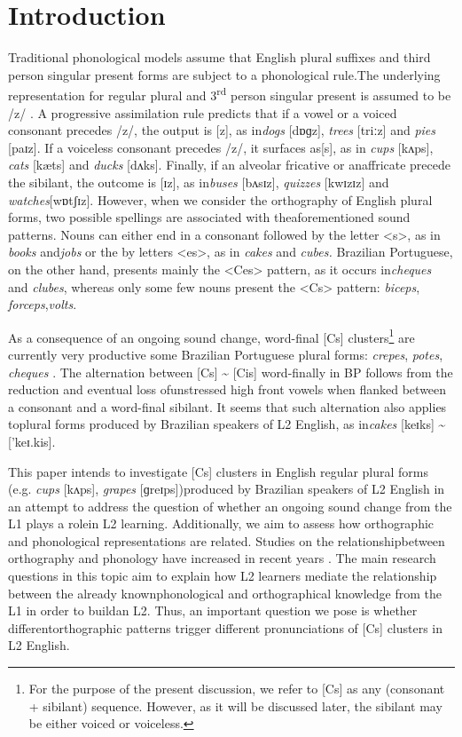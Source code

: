 \section{Introduction}
Traditional phonological models assume that English plural suffixes and
third person singular present forms are subject to a phonological rule.The
underlying representation for regular plural and
3\textsuperscript{rd} person singular present is assumed to be /z/ \citep{hayes2011}.
A progressive assimilation rule predicts that if a vowel
or a voiced consonant precedes /z/, the output is {[}z{]}, as in\emph{dogs}
{[}dɒɡz{]}, \emph{trees} {[}triːz{]} and \emph{pies}
{[}paɪz{]}. If a voiceless consonant precedes /z/, it surfaces as{[}s{]}, as in
\emph{cups} {[}kʌps{]}, \emph{cats} {[}kæts{]} and
\emph{ducks} {[}dʌks{]}. Finally, if an alveolar fricative or anaffricate
precede the sibilant, the outcome is {[}ɪz{]}, as in\emph{buses} {[}bʌsɪz{]},
\emph{quizzes} {[}kwɪzɪz{]} and \emph{watches}{[}wɒtʃɪz{]}. However, when we
consider the orthography of English
plural forms, two possible spellings are associated with theaforementioned
sound patterns. Nouns can either end in a consonant
followed by the letter \textless s\textgreater, as in \emph{books}
and\emph{jobs} or the by letters \textless es\textgreater, as in
\emph{cakes} and \emph{cubes.} Brazilian Portuguese, on the other hand,
presents mainly the \textless Ces\textgreater{} pattern, as it occurs
in\emph{cheques }and\emph{ clubes}, whereas only some few nouns present
the \textless Cs\textgreater{} pattern: \emph{biceps},
\emph{forceps},\emph{volts}.

As a consequence of an ongoing sound change, word-final {[}Cs{]}
clusters\footnote{ For the purpose of the present discussion, we refer  to
{[}Cs{]} as any (consonant + sibilant) sequence. However, as it
will be discussed later, the sibilant may be either voiced or  voiceless.}
are currently very productive some Brazilian Portuguese
plural forms: \emph{crepes}, \emph{potes}, \emph{cheques} \citep{soares2016}. The
alternation between {[}Cs{]} \textasciitilde{} {[}Cis{]}
word-finally in BP follows from the reduction and eventual loss ofunstressed
high front vowels when flanked between a consonant and a
word-final sibilant. It seems that such alternation also applies toplural forms
produced by Brazilian speakers of L2 English, as in\emph{cakes} {[}keɪks{]}
\textasciitilde{} {[}'keɪ.kis{]}.

This paper intends to investigate {[}Cs{]} clusters in English regular
plural forms (e.g. \emph{cups} {[}kʌps{]}, \emph{grapes} {[}ɡreɪps{]})produced
by Brazilian speakers of L2 English in an attempt to address
the question of whether an ongoing sound change from the L1 plays a rolein L2
learning. Additionally, we aim to assess how orthographic and
phonological representations are related. Studies on the relationshipbetween
orthography and phonology have increased in recent years
\citep{rafat2015,hamann2017,zhou2021}.
The main research questions in this topic aim to explain how
L2 learners mediate the relationship between the already knownphonological and
orthographical knowledge from the L1 in order to buildan L2. Thus, an important
question we pose is whether differentorthographic patterns trigger different
pronunciations of {[}Cs{]}
clusters in L2 English.

